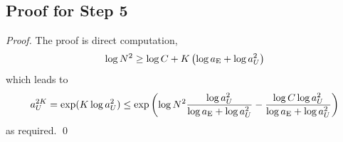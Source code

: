 \documentclass[smallextended]{svjour3}
\newcommand{\op}[1]{\operatorname{#1}}
\newcommand{\1}{\F{1}}
\newcommand*{\Varf}[1]{%
	\IfEqCase{#1}{%
		{0}{U}%
		{1}{V}%
		{2}{W}%
	}[u#1]%
}
\newcommand*{\vars}[1]{%
	\IfEqCase{#1}{%
		{0}{\alpha}%
		{1}{\beta}%
		{2}{\gamma}%
		{3}{a}%
		{4}{b}%
		{5}{c}%
	}[k#1]%
}
\begin{document}
	\subsection{Proof for Step 5}
	\begin{lemma}\label{app:thm: sufficiently slow}
	\end{lemma}
	\begin{proof}
		The proof is direct computation,
		\begin{equation}
			\log N^2 \geq \log C + K\left(\log \vars3_{\op{E}} + \log \vars3_{\Varf0}^2\right)
		\end{equation}
		which leads to
		\begin{equation}
			\vars3_{\Varf0}^{2K} = \exp(K\log \vars3_{\Varf0}^2)
			\leq \exp\left(\log N^2\frac{\log \vars3_{\Varf0}^2}{\log \vars3_{\op{E}} + \log \vars3_{\Varf0}^2} - \frac{\log C\log \vars3_{\Varf0}^2}{\log \vars3_{\op{E}} + \log \vars3_{\Varf0}^2}\right)
		\end{equation}
		as required.
		\qed\end{proof}
	
	
\end{document}
